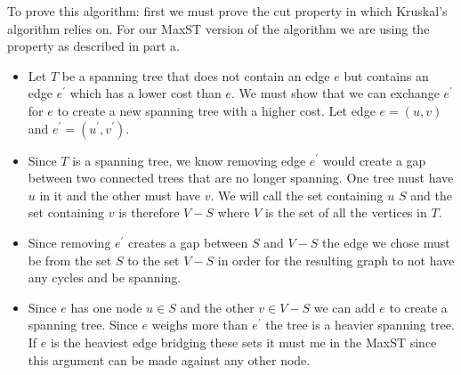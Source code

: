 \documentclass[letterpaper,11pt]{article}
\begin{document}
\begin{enumerate}
\begin{enumerate}
\begin{itemize}
                    To prove this algorithm: first we must prove the cut 
                    property in which Kruskal's algorithm relies on. For our
                    MaxST version of the algorithm we are using the property as 
                    described in part a.
                    \begin{itemize}
                        \item Let $T$ be a spanning tree that does not contain
                            an edge $e$ but contains an edge $e^{\prime}$ which 
                            has a lower cost than $e$. We must show that we can
                            exchange $e^{\prime}$ for $e$ to create a new 
                            spanning tree with a higher cost. Let edge
                            $e = (u, v)$ and  $e^{\prime} = (u^{\prime}, v^{\prime})$.

                        \item Since $T$ is a spanning tree, we know removing 
                            edge $e^{\prime}$ would create a gap between two 
                            connected trees that are no longer spanning. One
                            tree must have $u$ in it and the other must have $v$.
                            We will call the set containing $u$ $S$ and the set
                            containing $v$ is therefore $V - S$ where $V$ is
                            the set of all the vertices in $T$.

                        \item Since removing $e^{\prime}$ creates a gap between
                            $S$ and $V-S$ the edge we chose must be from the 
                            set $S$ to the set $V - S$ in order for the resulting
                            graph to not have any cycles and be spanning. 

                        \item Since  $e$ has one node $u \in S$ and the other 
                            $v \in V-S$ we can add $e$ to create a spanning
                            tree. Since $e$ weighs more than $e^{\prime}$ the 
                            tree is a heavier spanning tree. If $e$ is the heaviest
                            edge bridging these sets it must me in the MaxST 
                            since this argument can be made against any other 
                            node.

                    \end{itemize}


\end{itemize}
\end{enumerate}
\end{enumerate}
\end{document}
